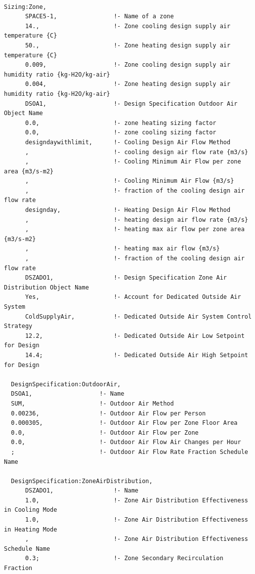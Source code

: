 \begin{lstlisting}

Sizing:Zone,
      SPACE5-1,                !- Name of a zone
      14.,                     !- Zone cooling design supply air temperature {C}
      50.,                     !- Zone heating design supply air temperature {C}
      0.009,                   !- Zone cooling design supply air humidity ratio {kg-H2O/kg-air}
      0.004,                   !- Zone heating design supply air humidity ratio {kg-H2O/kg-air}
      DSOA1,                   !- Design Specification Outdoor Air Object Name
      0.0,                     !- zone heating sizing factor
      0.0,                     !- zone cooling sizing factor
      designdaywithlimit,      !- Cooling Design Air Flow Method
      ,                        !- cooling design air flow rate {m3/s}
      ,                        !- Cooling Minimum Air Flow per zone area {m3/s-m2}
      ,                        !- Cooling Minimum Air Flow {m3/s}
      ,                        !- fraction of the cooling design air flow rate
      designday,               !- Heating Design Air Flow Method
      ,                        !- heating design air flow rate {m3/s}
      ,                        !- heating max air flow per zone area {m3/s-m2}
      ,                        !- heating max air flow {m3/s}
      ,                        !- fraction of the cooling design air flow rate
      DSZADO1,                 !- Design Specification Zone Air Distribution Object Name
      Yes,                     !- Account for Dedicated Outside Air System
      ColdSupplyAir,           !- Dedicated Outside Air System Control Strategy
      12.2,                    !- Dedicated Outside Air Low Setpoint for Design
      14.4;                    !- Dedicated Outside Air High Setpoint for Design

  DesignSpecification:OutdoorAir,
  DSOA1,                   !- Name
  SUM,                     !- Outdoor Air Method
  0.00236,                 !- Outdoor Air Flow per Person
  0.000305,                !- Outdoor Air Flow per Zone Floor Area
  0.0,                     !- Outdoor Air Flow per Zone
  0.0,                     !- Outdoor Air Flow Air Changes per Hour
  ;                        !- Outdoor Air Flow Rate Fraction Schedule Name

  DesignSpecification:ZoneAirDistribution,
      DSZADO1,                 !- Name
      1.0,                     !- Zone Air Distribution Effectiveness in Cooling Mode
      1.0,                     !- Zone Air Distribution Effectiveness in Heating Mode
      ,                        !- Zone Air Distribution Effectiveness Schedule Name
      0.3;                     !- Zone Secondary Recirculation Fraction
\end{lstlisting}

